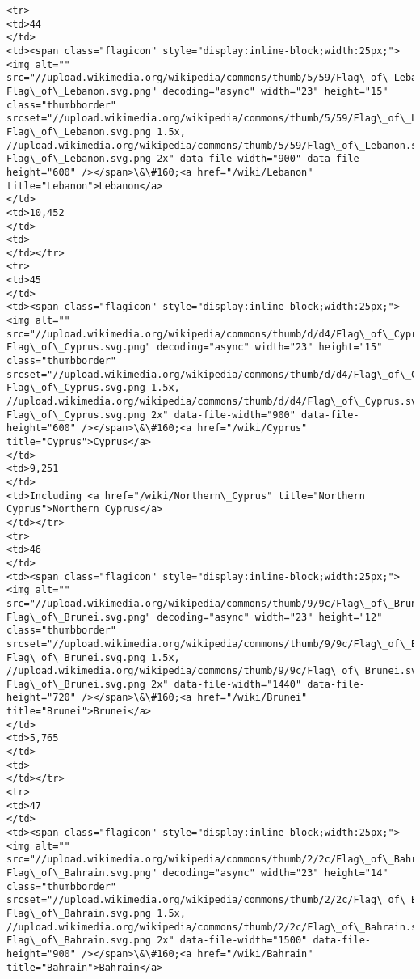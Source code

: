 \documentclass[11pt]{article}
\begin{document}
\begin{Verbatim}[commandchars=\\\{\}]
<tr>
<td>44
</td>
<td><span class="flagicon" style="display:inline-block;width:25px;"><img alt="" src="//upload.wikimedia.org/wikipedia/commons/thumb/5/59/Flag\_of\_Lebanon.svg/23px-Flag\_of\_Lebanon.svg.png" decoding="async" width="23" height="15" class="thumbborder" srcset="//upload.wikimedia.org/wikipedia/commons/thumb/5/59/Flag\_of\_Lebanon.svg/35px-Flag\_of\_Lebanon.svg.png 1.5x, //upload.wikimedia.org/wikipedia/commons/thumb/5/59/Flag\_of\_Lebanon.svg/45px-Flag\_of\_Lebanon.svg.png 2x" data-file-width="900" data-file-height="600" /></span>\&\#160;<a href="/wiki/Lebanon" title="Lebanon">Lebanon</a>
</td>
<td>10,452
</td>
<td>
</td></tr>
<tr>
<td>45
</td>
<td><span class="flagicon" style="display:inline-block;width:25px;"><img alt="" src="//upload.wikimedia.org/wikipedia/commons/thumb/d/d4/Flag\_of\_Cyprus.svg/23px-Flag\_of\_Cyprus.svg.png" decoding="async" width="23" height="15" class="thumbborder" srcset="//upload.wikimedia.org/wikipedia/commons/thumb/d/d4/Flag\_of\_Cyprus.svg/35px-Flag\_of\_Cyprus.svg.png 1.5x, //upload.wikimedia.org/wikipedia/commons/thumb/d/d4/Flag\_of\_Cyprus.svg/45px-Flag\_of\_Cyprus.svg.png 2x" data-file-width="900" data-file-height="600" /></span>\&\#160;<a href="/wiki/Cyprus" title="Cyprus">Cyprus</a>
</td>
<td>9,251
</td>
<td>Including <a href="/wiki/Northern\_Cyprus" title="Northern Cyprus">Northern Cyprus</a>
</td></tr>
<tr>
<td>46
</td>
<td><span class="flagicon" style="display:inline-block;width:25px;"><img alt="" src="//upload.wikimedia.org/wikipedia/commons/thumb/9/9c/Flag\_of\_Brunei.svg/23px-Flag\_of\_Brunei.svg.png" decoding="async" width="23" height="12" class="thumbborder" srcset="//upload.wikimedia.org/wikipedia/commons/thumb/9/9c/Flag\_of\_Brunei.svg/35px-Flag\_of\_Brunei.svg.png 1.5x, //upload.wikimedia.org/wikipedia/commons/thumb/9/9c/Flag\_of\_Brunei.svg/46px-Flag\_of\_Brunei.svg.png 2x" data-file-width="1440" data-file-height="720" /></span>\&\#160;<a href="/wiki/Brunei" title="Brunei">Brunei</a>
</td>
<td>5,765
</td>
<td>
</td></tr>
<tr>
<td>47
</td>
<td><span class="flagicon" style="display:inline-block;width:25px;"><img alt="" src="//upload.wikimedia.org/wikipedia/commons/thumb/2/2c/Flag\_of\_Bahrain.svg/23px-Flag\_of\_Bahrain.svg.png" decoding="async" width="23" height="14" class="thumbborder" srcset="//upload.wikimedia.org/wikipedia/commons/thumb/2/2c/Flag\_of\_Bahrain.svg/35px-Flag\_of\_Bahrain.svg.png 1.5x, //upload.wikimedia.org/wikipedia/commons/thumb/2/2c/Flag\_of\_Bahrain.svg/46px-Flag\_of\_Bahrain.svg.png 2x" data-file-width="1500" data-file-height="900" /></span>\&\#160;<a href="/wiki/Bahrain" title="Bahrain">Bahrain</a>

\end{Verbatim}
\end{document}
